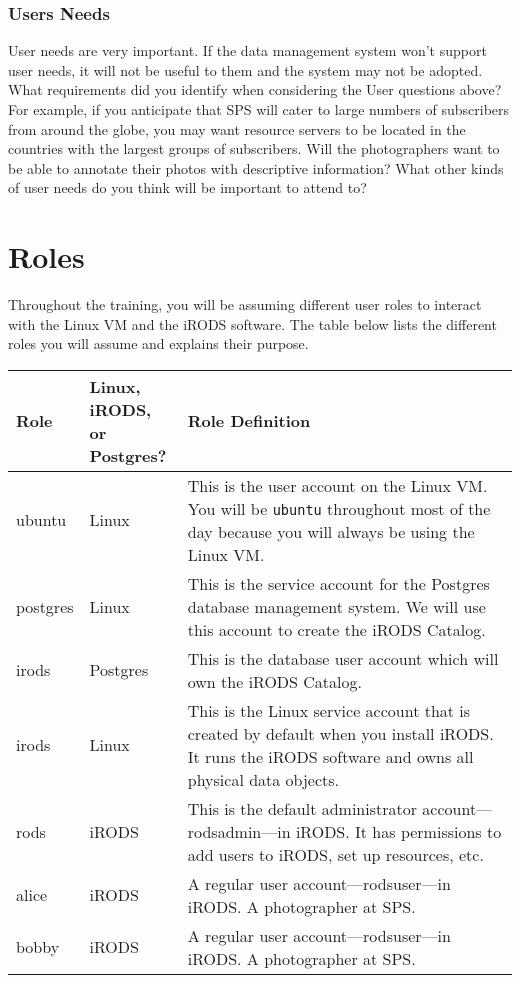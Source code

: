 \documentclass[10pt,oneside]{memoir}
\begin{document}
\subsection{Users Needs}

User needs are very important. If the data management system won't support user needs, it will not be useful to them and the system may not be adopted. What requirements did you identify when considering the User questions above? For example, if you anticipate that SPS will cater to large numbers of subscribers from around the globe, you may want resource servers to be located in the countries with the largest groups of subscribers. Will the photographers want to be able to annotate their photos with descriptive information? What other kinds of user needs do you think will be important to attend to?

\chapter{Roles}

Throughout the training, you will be assuming different user roles to interact with the Linux VM and the iRODS software. The table below lists the different roles you will assume and explains their purpose.

\begin{center}
\def\arraystretch{1.7}%
\begin{tabular}{ |l|l|p{11cm}| }
\hline
Role & \makecell[c]{Linux, \\ iRODS, \\ or Postgres?} & Role Definition \\
\hline
ubuntu & Linux & This is the user account on the Linux VM. You will be \texttt{ubuntu} throughout most of the day because you will always be using the Linux VM. \\
postgres & Linux & This is the service account for the Postgres database management system. We will use this account to create the iRODS Catalog. \\
irods & Postgres & This is the database user account which will own the iRODS Catalog. \\
irods & Linux & This is the Linux service account that is created by default when you install iRODS. It runs the iRODS software and owns all physical data objects. \\
rods & iRODS & This is the default administrator account---rodsadmin---in iRODS. It has permissions to add users to iRODS, set up resources, etc. \\
alice & iRODS & A regular user account---rodsuser---in iRODS. A photographer at SPS. \\
bobby & iRODS & A regular user account---rodsuser---in iRODS. A photographer at SPS. \\
\hline
\end{tabular}
\end{center}
\end{document}
